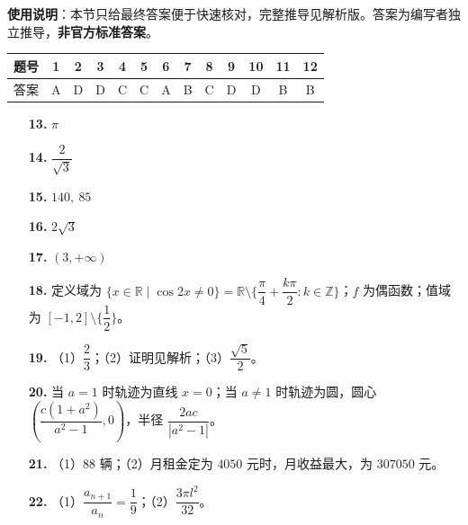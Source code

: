 
\begin{gknotice}
\textbf{使用说明}：本节只给最终答案便于快速核对，完整推导见解析版。答案为编写者独立推导，\textbf{非官方标准答案}。
\end{gknotice}

\begin{center}\begin{tabular}{ccccccccccccc}
\toprule
题号 & 1 & 2 & 3 & 4 & 5 & 6 & 7 & 8 & 9 & 10 & 11 & 12 \\
\midrule
答案 & A & D & D & C & C & A & B & C & D & D & B & B \\
\bottomrule
\end{tabular}\end{center}

\begin{itemize}[leftmargin=2.6em]
  \item[\textbf{13.}] $\pi$
  \item[\textbf{14.}] $\dfrac{2}{\sqrt3}$
  \item[\textbf{15.}] $140,\ 85$
  \item[\textbf{16.}] $2\sqrt3$
\end{itemize}

\begin{itemize}[leftmargin=2.6em]
  \item[\textbf{17.}] $(3,+\infty)$
  \item[\textbf{18.}] 定义域为 $\{x\in\mathbb R\mid \cos2x\ne0\}=\mathbb R\setminus\{\dfrac{\pi}{4}+\dfrac{k\pi}{2}:k\in\mathbb Z\}$；$f$ 为偶函数；值域为 $[-1,2]\setminus\{\dfrac12\}$。
  \item[\textbf{19.}] （1）$\dfrac{2}{3}$；（2）证明见解析；（3）$\dfrac{\sqrt5}{2}$。
  \item[\textbf{20.}] 当 $a=1$ 时轨迹为直线 $x=0$；当 $a\ne1$ 时轨迹为圆，圆心 $\left(\dfrac{c(1+a^2)}{a^2-1},0\right)$，半径 $\dfrac{2ac}{|a^2-1|}$。
  \item[\textbf{21.}] （1）$88$ 辆；（2）月租金定为 $4050$ 元时，月收益最大，为 $307050$ 元。
  \item[\textbf{22.}] （1）$\dfrac{a_{n+1}}{a_n}=\dfrac19$；（2）$\dfrac{3\pi l^2}{32}$。
\end{itemize}
